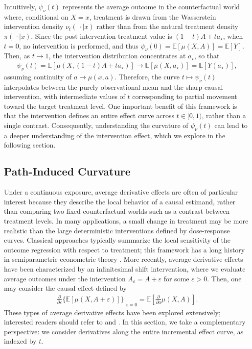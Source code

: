 \documentclass[11pt,twoside]{article}
\theoremstyle{definition}
\theoremstyle{remark}
\begin{document}
Intuitively, $\psi_\nu(t)$ represents the average outcome in the counterfactual world where, conditional on $X=x$, treatment is drawn from the Wasserstein intervention density $\nu_t(\, \cdot\mid x)$ rather than from the natural treatment density $\pi(\, \cdot\mid x)$. Since the post-intervention treatment value is $(1-t)A+t a_{\star}$, when $t = 0$, no intervention is performed, and thus $\psi_\nu(0)= \mathbb{E}[\mu(X,A)]= \mathbb{E}[Y]$. Then, as $t\to 1$, the intervention distribution concentrates at $a_{\star}$, so that
\begin{align*}
    \psi_\nu(t) = \mathbb{E}[\mu(X,(1-t)A+ta_{\star})] \longrightarrow \mathbb{E}[\mu(X,a_{\star})] = \mathbb{E}[Y(a_{\star})],
\end{align*}
assuming continuity of $a \mapsto \mu(x,a)$. Therefore, the curve $t \mapsto \psi_\nu(t)$ interpolates between the purely observational mean and the sharp causal intervention, with intermediate values of $t$ corresponding to partial movement toward the target treatment level. One important benefit of this framework is that the intervention defines an entire effect curve across $t \in [0, 1)$, rather than a single contrast. Consequently, understanding the curvature of $\psi_\nu(t)$ can lead to a deeper understanding of the intervention effect, which we explore in the following section. 


\subsection{Path-Induced Curvature} \label{curvature_section}

Under a continuous exposure, average derivative effects are often of particular interest because they describe the local behavior of a causal estimand, rather than comparing two fixed counterfactual worlds such as a contrast between treatment levels. In many applications, a small change in treatment may be more realistic than the large deterministic interventions defined by dose-response curves. Classical approaches typically summarize the local sensitivity of the outcome regression with respect to treatment; this framework has a long history in semiparametric econometric theory \citep{hardle_stoker_89, powell89, newey93}. More recently, average derivative effects have been characterized by an infinitesimal shift intervention, where we evaluate average outcomes under the intervention $A_\varepsilon = A + \varepsilon$ for some $\varepsilon > 0$. Then, one may consider the causal effect defined by
\begin{align} \label{avg_derivative_effect}
    \left. \frac{\partial}{\partial \varepsilon} \Big\{ \mathbb{E}[\mu(X, A + \varepsilon)] \Big\} \right|_{\varepsilon=0} = \mathbb{E}\! \left[ \frac{\partial}{\partial a}\mu(X,A) \right].
\end{align}
These types of average derivative effects have been explored extensively; interested readers should refer to \cite{rothenhausler2020incrementalcausaleffects, athey2021, mcclean2024nonparametric, zhou2025marginalinterventionaleffects, zhang2025doublyrobustinferencecausal, hines26} and \cite{klyne2026}. In this section, we take a complementary perspective: we consider derivatives along the entire incremental effect curve, as indexed by $t$.
\end{document}
